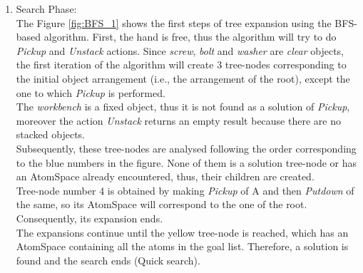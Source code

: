 \begin{enumerate}
	\item Search Phase: \\
The Figure \ref{fig:BFS_1} shows the first steps of tree expansion using the BFS-based algorithm.
First, the hand is free, thus the algorithm will try to do \textit{Pickup} and \textit{Unstack} actions. Since \textit{screw}, \textit{bolt} and \textit{washer} are \textit{clear} objects, the first iteration of the algorithm will create 3 tree-nodes corresponding to the initial object arrangement (i.e., the arrangement of the root), except the one to which \textit{Pickup} is performed. \\
The \textit{workbench} is a fixed object, thus it is not found as a solution of \textit{Pickup}, moreover the action \textit{Unstack} returns an empty result because there are no stacked objects\footnotemark{}.
\\Subsequently, these tree-nodes are analysed following the order corresponding to the blue numbers in the figure. None of them is a solution tree-node or has an AtomSpace already encountered, thus, their children are created. \\
Tree-node number 4 is obtained by making \textit{Pickup} of A and then \textit{Putdown} of the same, so its AtomSpace will correspond to the one of the root. Consequently, its expansion ends. \\
The expansions continue until the yellow tree-node is reached, which has an AtomSpace containing all the atoms in the goal list. Therefore, a solution is found and the search ends (Quick search).


\end{enumerate}
